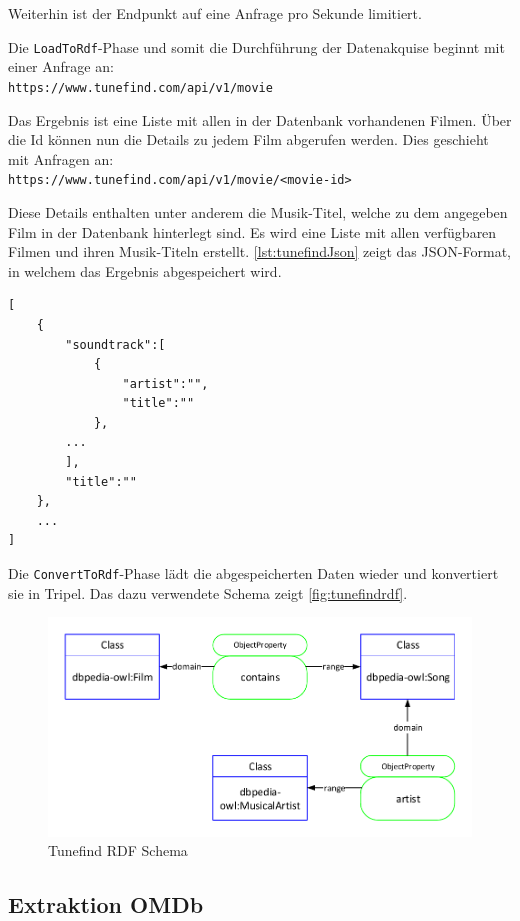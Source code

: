 \documentclass[parskip]{scrartcl}
\begin{document}
Weiterhin ist der Endpunkt auf eine Anfrage pro Sekunde limitiert.

Die \texttt{LoadToRdf}-Phase und somit die Durchführung der Datenakquise beginnt mit einer Anfrage an:\\
\texttt{https://www.tunefind.com/api/v1/movie}

Das Ergebnis ist eine Liste mit allen in der Datenbank vorhandenen Filmen. Über die Id können nun die Details zu jedem Film abgerufen werden. Dies geschieht mit Anfragen an:\\
\texttt{https://www.tunefind.com/api/v1/movie/<movie-id>}

Diese Details enthalten unter anderem die Musik-Titel, welche zu dem angegeben Film in der Datenbank hinterlegt sind.
Es wird eine Liste mit allen verfügbaren Filmen und ihren Musik-Titeln erstellt. \autoref{lst:tunefindJson} zeigt das JSON-Format, in welchem das Ergebnis abgespeichert wird.

\begin{lstlisting}[caption={Tunefind JSON-Format}, label={lst:tunefindJson}]
[  
    {  
        "soundtrack":[  
            {
                "artist":"",
                "title":""
            },
        ...
        ],
        "title":""
    },
    ...
]
\end{lstlisting}

Die \texttt{ConvertToRdf}-Phase lädt die abgespeicherten Daten wieder und konvertiert sie in Tripel. Das dazu verwendete Schema zeigt \autoref{fig:tunefindrdf}.

\begin{figure}[H]
    \centering
    \includegraphics[scale=0.8]{tunefind}
    \caption{Tunefind RDF Schema}
    \label{fig:tunefindrdf}
\end{figure}

\subsection{Extraktion OMDb}
\end{document}
